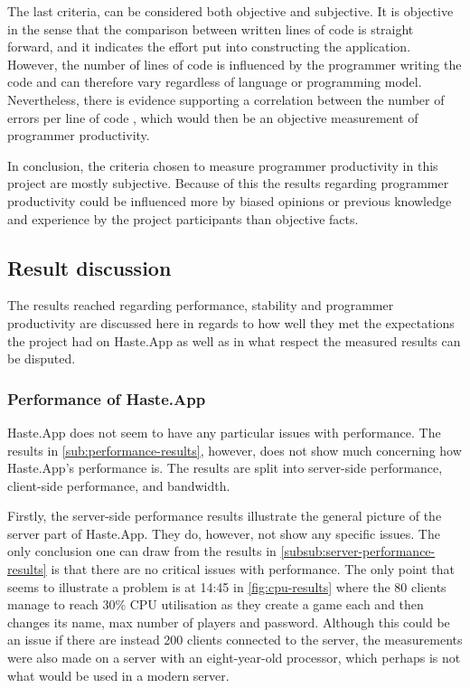 \documentclass[a4paper]{article}
\begin{document}
The last criteria, can be considered both objective and subjective. It is objective in the sense that the comparison between written lines of code is straight forward, and it indicates the effort put into constructing the application. However, the number of lines of code is influenced by the programmer writing the code and can therefore vary regardless of language or programming model. Nevertheless, there is evidence supporting a correlation between the number of errors per line of code \cite{mcconnell2004code}, which would then be an objective measurement of programmer productivity.

In conclusion, the criteria chosen to measure programmer productivity in this project are mostly subjective. Because of this the results regarding programmer productivity could be influenced more by biased opinions or previous knowledge and experience by the project participants than objective facts.


\subsection{Result discussion}
The results reached regarding performance, stability and programmer productivity are discussed here in regards to how well they met the expectations the project had on Haste.App as well as in what respect the measured results can be disputed.

\subsubsection{Performance of Haste.App}
Haste.App does not seem to have any particular issues with performance. The results in \cref{sub:performance-results}, however, does not show much concerning how Haste.App's performance is. The results are split into server-side performance, client-side performance, and bandwidth.

Firstly, the server-side performance results illustrate the general picture of the server part of Haste.App. They do, however, not show any specific issues. The only conclusion one can draw from the results in \cref{subsub:server-performance-results} is that there are no critical issues with performance. The only point that seems to illustrate a problem is at 14:45 in \cref{fig:cpu-results} where the 80 clients manage to reach 30\% CPU utilisation as they create a game each and then changes its name, max number of players and password. Although this could be an issue if there are instead 200 clients connected to the server, the measurements were also made on a server with an eight-year-old processor, which perhaps is not what would be used in a modern server.
\end{document}
